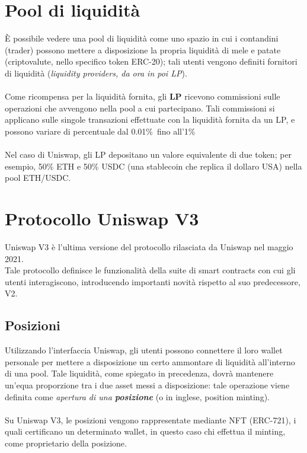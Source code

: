 \documentclass[12pt,a4paper]{report}
\begin{document}
\section{Pool di liquidità}

È possibile vedere una pool di liquidità come uno spazio in cui i contandini (trader) possono mettere a disposizione la propria liquidità di mele e patate (criptovalute, nello specifico token ERC-20\cite{erc_20}); tali utenti vengono definiti fornitori di liquidità (\textit{liquidity providers, da ora in poi LP}).
\\\\Come ricompensa per la liquidità fornita, gli \textbf{LP} ricevono commissioni sulle operazioni che avvengono nella pool a cui partecipano. 
Tali commissioni si applicano sulle singole transazioni effettuate con la liquidità fornita da un LP, e possono variare di percentuale dal 0.01\%\ fino all'1\%\.\\\\Nel caso di Uniswap, gli LP depositano un valore equivalente di due token; per esempio, 50\% ETH e 50\% USDC (una stablecoin che replica il dollaro USA) nella pool ETH/USDC.


\section{Protocollo Uniswap V3}

Uniswap V3 è l'ultima versione del protocollo rilasciata da Uniswap nel maggio 2021\cite{uniswap}.\\ Tale protocollo definisce le funzionalità della suite di smart contracts con cui gli utenti interagiscono, introducendo importanti novità rispetto al suo predecessore, V2.

\subsection{Posizioni}

Utilizzando l'interfaccia Uniswap, gli utenti possono connettere il loro wallet personale per mettere a disposizione un certo ammontare di liquidità all'interno di una pool.
Tale liquidità, come spiegato in precedenza, dovrà mantenere un'equa proporzione tra i due asset messi a disposizione: tale operazione viene definita come \textit{apertura di una \textbf{posizione}} (o in inglese, position minting).
\\\\Su Uniswap V3, le posizioni vengono rappresentate mediante NFT (ERC-721\cite{erc_721}), i quali certificano un determinato wallet, in questo caso chi effettua il minting, come proprietario della posizione.
\end{document}
